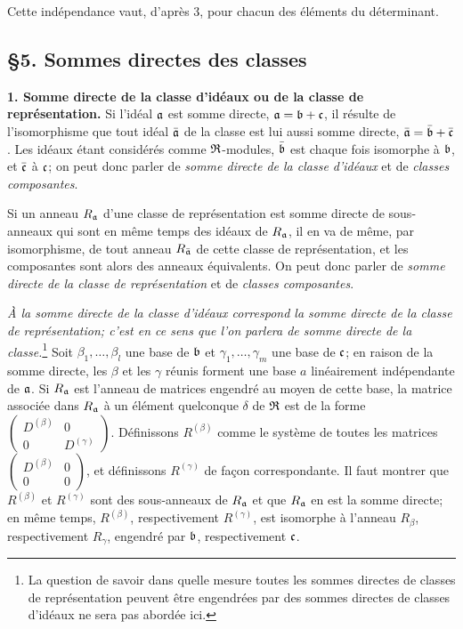 Cette indépendance vaut, d'après 3, pour chacun des éléments du déterminant.

\subsection*{\S 5. Sommes directes des classes}

\textbf{1. Somme directe de la classe d'idéaux ou de la classe de représentation.} Si l'idéal $\mathfrak a$ est somme directe, $\mathfrak a=\mathfrak b+\mathfrak c$, il résulte de l'isomorphisme que tout idéal $\bar{\mathfrak a}$ de la classe est lui aussi somme directe, $\bar{\mathfrak a}=\bar{\mathfrak b}+\bar{\mathfrak c}$. Les idéaux étant considérés comme $\mathfrak R$-modules, $\bar{\mathfrak b}$ est chaque fois isomorphe à $\mathfrak b$, et $\bar{\mathfrak c}$ à $\mathfrak c$; on peut donc parler de \emph{somme directe de la classe d'idéaux} et de \emph{classes composantes}.

Si un anneau $R_\mathfrak a$ d'une classe de représentation est somme directe de sous-anneaux qui sont en même temps des idéaux de $R_\mathfrak a$, il en va de même, par isomorphisme, de tout anneau $R_{\bar{\mathfrak a}}$ de cette classe de représentation, et les composantes sont alors des anneaux équivalents. On peut donc parler de \emph{somme directe de la classe de représentation} et de \emph{classes composantes}.

\emph{À la somme directe de la classe d'idéaux correspond la somme directe de la classe de représentation; c'est en ce sens que l'on parlera de somme directe de la classe.}\footnote{La question de savoir dans quelle mesure toutes les sommes directes de classes de représentation peuvent être engendrées par des sommes directes de classes d'idéaux ne sera pas abordée ici.} Soit $\beta_1,\ldots,\beta_l$ une base de $\mathfrak b$ et $\gamma_1,\ldots,\gamma_m$ une base de $\mathfrak c$; en raison de la somme directe, les $\beta$ et les $\gamma$ réunis forment une base $a$ linéairement indépendante de $\mathfrak a$. Si $R_\mathfrak a$ est l'anneau de matrices engendré au moyen de cette base, la matrice associée dans $R_\mathfrak a$ à un élément quelconque $\delta$ de $\mathfrak R$ est de la forme
$\left(\begin{smallmatrix}D^{(\beta)}&0\\0&D^{(\gamma)}\end{smallmatrix}\right)$.
Définissons $R^{(\beta)}$ comme le système de toutes les matrices
$\left(\begin{smallmatrix}D^{(\beta)}&0\\0&0\end{smallmatrix}\right)$,
et définissons $R^{(\gamma)}$ de façon correspondante. Il faut montrer que $R^{(\beta)}$ et $R^{(\gamma)}$ sont des sous-anneaux de $R_\mathfrak a$ et que $R_\mathfrak a$ en est la somme directe; en même temps, $R^{(\beta)}$, respectivement $R^{(\gamma)}$, est isomorphe à l'anneau $R_\beta$, respectivement $R_\gamma$, engendré par $\mathfrak b$, respectivement $\mathfrak c$.

